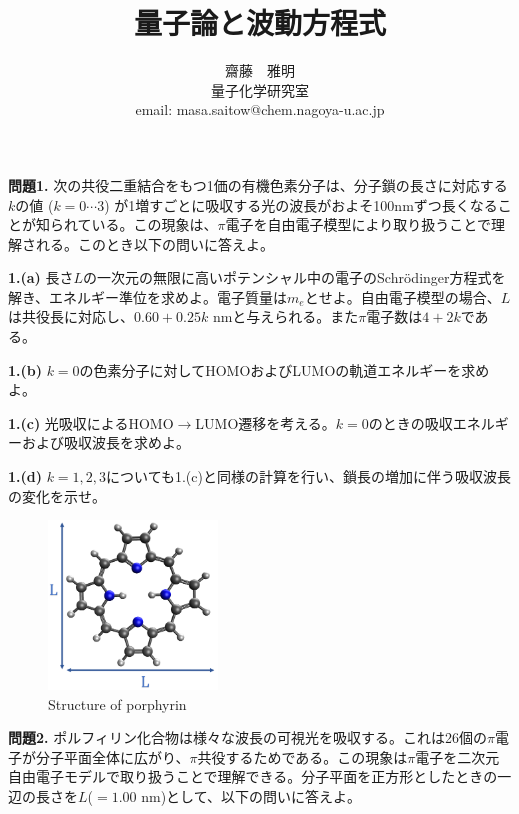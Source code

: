 \documentclass[12pt,pra,aps]{revtex4}
\begin{document}
\title{量子論と波動方程式}
\author{齋藤　雅明 \\ 量子化学研究室 \\ email: masa.saitow@chem.nagoya-u.ac.jp}

\maketitle

\noindent
{\bf 問題1.} 次の共役二重結合をもつ1価の有機色素分子は、分子鎖の長さに対応する$k$の値 ($k=0\cdots 3$) が1増すごとに吸収する光の波長がおよそ100nmずつ長くなることが知られている。この現象は、$\pi$電子を自由電子模型により取り扱うことで理解される。このとき以下の問いに答えよ。

\noindent
{\bf 1.(a)} 長さ$L$の一次元の無限に高いポテンシャル中の電子のSchr\"odinger方程式を解き、エネルギー準位を求めよ。電子質量は$m_e$とせよ。自由電子模型の場合、$L$は共役長に対応し、$0.60+0.25k$ nmと与えられる。また$\pi$電子数は$4+2k$である。

\noindent
{\bf 1.(b)} $k=0$の色素分子に対してHOMOおよびLUMOの軌道エネルギーを求めよ。

\noindent
{\bf 1.(c)} 光吸収によるHOMO$\rightarrow$LUMO遷移を考える。$k=0$のときの吸収エネルギーおよび吸収波長を求めよ。

\noindent
{\bf 1.(d)} $k=1,2,3$についても1.(c)と同様の計算を行い、鎖長の増加に伴う吸収波長の変化を示せ。

\begin{figure}
  \centering
  \includegraphics[width=4.5cm]{porph1.png}
  \caption{Structure of porphyrin}
\end{figure}

\noindent
{\bf 問題2.} ポルフィリン化合物は様々な波長の可視光を吸収する。これは26個の$\pi$電子が分子平面全体に広がり、$\pi$共役するためである。この現象は$\pi$電子を二次元自由電子モデルで取り扱うことで理解できる。分子平面を正方形としたときの一辺の長さを$L$($=1.00$ nm)として、以下の問いに答えよ。
\end{document}
